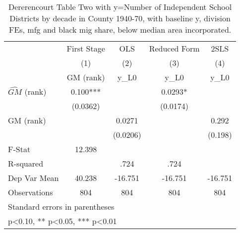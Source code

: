 \begin{table}[htbp]\centering
\def\sym#1{\ifmmode^{#1}\else\(^{#1}\)\fi}
\caption{Dererencourt Table Two with y=Number of Independent School Districts by decade in County 1940-70, with baseline y, division FEs, mfg and black mig share, below median area incorporated.}
\begin{tabular}{l*{4}{c}}
\toprule
                    & First Stage   &         OLS   &Reduced Form   &        2SLS   \\
                    &\multicolumn{1}{c}{(1)}&\multicolumn{1}{c}{(2)}&\multicolumn{1}{c}{(3)}&\multicolumn{1}{c}{(4)}\\
                    &\multicolumn{1}{c}{GM  (rank)}&\multicolumn{1}{c}{y\_L0}&\multicolumn{1}{c}{y\_L0}&\multicolumn{1}{c}{y\_L0}\\
\midrule
$\hat{GM}$ (rank)   &       0.100***&               &      0.0293*  &               \\
                    &    (0.0362)   &               &    (0.0174)   &               \\
\addlinespace
GM  (rank)          &               &      0.0271   &               &       0.292   \\
                    &               &    (0.0206)   &               &     (0.198)   \\
\midrule
F-Stat              &      12.398   &               &               &               \\
R-squared           &               &        .724   &        .724   &               \\
Dep Var Mean        &      40.238   &     -16.751   &     -16.751   &     -16.751   \\
Observations        &         804   &         804   &         804   &         804   \\
\bottomrule
\multicolumn{5}{l}{\footnotesize Standard errors in parentheses}\\
\multicolumn{5}{l}{\footnotesize * p<0.10, ** p<0.05, *** p<0.01}\\
\end{tabular}
\end{table}
